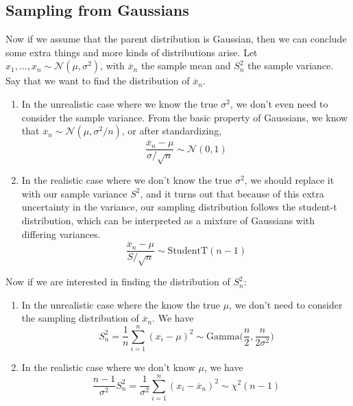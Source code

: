 \documentclass{article}
\begin{document}
  \subsection{Sampling from Gaussians}

    Now if we assume that the parent distribution is Gaussian, then we can conclude some extra things and more kinds of distributions arise. Let $x_1, \ldots, x_n \sim \mathcal{N}(\mu, \sigma^2)$, with $\overline{x}_n$ the sample mean and $S^2_n$ the sample variance. Say that we want to find the distribution of $\overline{x}_n$. 
    \begin{enumerate}
      \item In the unrealistic case where we know the true $\sigma^2$, we don't even need to consider the sample variance. From the basic property of Gaussians, we know that $\overline{x}_n \sim \mathcal{N}(\mu, \sigma^2/n)$, or after standardizing, 
      \begin{equation}
        \frac{\overline{x}_n - \mu}{\sigma/\sqrt{n}} \sim \mathcal{N}(0, 1)
      \end{equation}
      \item In the realistic case where we don't know the true $\sigma^2$, we should replace it with our sample variance $S^2$, and it turns out that because of this extra uncertainty in the variance, our sampling distribution follows the student-t distribution, which can be interpreted as a mixture of Gaussians with differing variances. 
      \begin{equation}
        \frac{\overline{x}_n - \mu}{S/\sqrt{n}} \sim \mathrm{StudentT}(n-1)
      \end{equation}
    \end{enumerate}
    Now if we are interested in finding the distribution of $S^2_n$: 
    \begin{enumerate}
      \item In the unrealistic case where the know the true $\mu$, we don't need to consider the sampling distribution of $\overline{x}_n$. We have 
      \begin{equation}
        S^2_n = \frac{1}{n} \sum_{i=1}^n (x_i - \mu)^2 \sim \mathrm{Gamma}\Big( \frac{n}{2}, \frac{n}{2 \sigma^2} \Big)
      \end{equation}
      \item In the realistic case where we don't know $\mu$, we have 
      \begin{equation}
        \frac{n-1}{\sigma^2} S^2_n = \frac{1}{\sigma^2} \sum_{i=1}^n (x_i - \overline{x}_n )^2 \sim \chi^2 (n-1)
      \end{equation}
    \end{enumerate}
\end{document}
